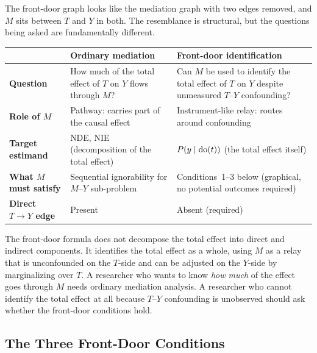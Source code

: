 \documentclass[master.tex]{subfiles}
\begin{document}
\begin{tcolorbox}[defstyle, title={Two Different Questions About a Mediator-Like Variable}]
\label{w8:box:fd-vs-mediation}
The front-door graph looks like the mediation graph with two edges
removed, and $M$ sits between $T$ and $Y$ in both.  The resemblance is
structural, but the questions being asked are fundamentally different.

\medskip
\begin{center}
\renewcommand{\arraystretch}{1.5}
\begin{tabular}{p{2.2cm} p{5.0cm} p{5.0cm}}
\toprule
  & \textbf{Ordinary mediation}
  & \textbf{Front-door identification} \\
\midrule
\textbf{Question}
  & How much of the total effect of $T$ on $Y$ flows through $M$?
  & Can $M$ be used to identify the total effect of $T$ on $Y$ despite
    unmeasured $T$--$Y$ confounding? \\
\textbf{Role of $M$}
  & Pathway: carries part of the causal effect
  & Instrument-like relay: routes around confounding \\
\textbf{Target estimand}
  & NDE, NIE (decomposition of the total effect)
  & $P(y \mid \mathrm{do}(t))$ (the total effect itself) \\
\textbf{What $M$ must satisfy}
  & Sequential ignorability for $M$--$Y$ sub-problem
  & Conditions~1--3 below (graphical, no potential outcomes required) \\
\textbf{Direct $T \to Y$ edge}
  & Present
  & Absent (required) \\
\bottomrule
\end{tabular}
\end{center}

\medskip\noindent The front-door formula does not decompose the total
effect into direct and indirect components.  It identifies the total
effect as a whole, using $M$ as a relay that is unconfounded on the
$T$-side and can be adjusted on the $Y$-side by marginalizing over $T$.
A researcher who wants to know \emph{how much} of the effect goes
through $M$ needs ordinary mediation analysis.  A researcher who cannot
identify the total effect at all because $T$--$Y$ confounding is
unobserved should ask whether the front-door conditions hold.
\end{tcolorbox}

\subsection{The Three Front-Door Conditions}
\end{document}
